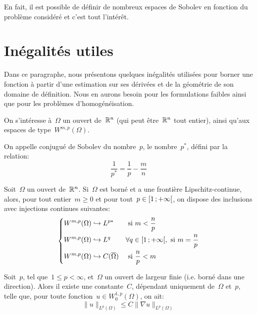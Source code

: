 \medskip
En fait, il est possible de définir de nombreux espaces de Sobolev en fonction du problème considéré et c'est tout l'intérêt.

\medskip
\section{Inégalités utiles}
Dans ce paragraphe, nous présentons quelques inégalités utilisées pour borner une fonction à partir d'une estimation sur ses dérivées et de la géométrie de son domaine de définition. Nous en aurons besoin pour les formulations faibles ainsi que pour les problèmes d'homogénéisation.
%
\begin{definition}
On s'intéresse à~$\Omega$ un ouvert de~$\mathbb R^n$ (qui peut être~$\mathbb R^n$ tout entier), ainsi qu'aux espaces de type~$W^{m,p}(\Omega)$.

On appelle conjugué de Sobolev du nombre~$p$, le nombre~$p^*$, défini par la relation:
\begin{equation}
  \frac{1}{p^*} = \frac{1}{p} - \frac{m}{n}
\end{equation}
\end{definition}
\begin{theoreme}\label{Th-Inj-Sobo}
Soit~$\Omega$ un ouvert de~$\mathbb R^n$. Si~$\Omega$ est borné et a une frontière Lipschitz-continue, alors, pour tout entier~$m\ge 0$ et pour tout~$p\in\mathopen{[}1\,;+\infty\mathclose{[}$, on dispose des inclusions avec injections continues suivantes:
\begin{equation}
\left\{\begin{aligned}
&W^{m,p}(\Omega) \hookrightarrow L^{p*} && \text{ si } m<\frac{n}p\\
&W^{m,p}(\Omega) \hookrightarrow L^q && \forall q\in\mathopen{[}1\,;+\infty\mathclose{[}, \text{ si } m=\frac{n}p\\
&W^{m,p}(\Omega) \hookrightarrow C(\overline{\Omega}) && \text{ si } \frac{n}p<m
\end{aligned}\right.
\end{equation}
\end{theoreme}

\medskipvm
\begin{theoreme}
Soit~$p$, tel que~$1 \le p <\infty$, et~$\Omega$ un ouvert de largeur finie
(i.e. borné dans une direction).
Alors il existe une constante~$C$, dépendant uniquement de~$\Omega$ et~$p$, telle que, pour toute fonction~$u\in W_0^{1,p}(\Omega)$, on ait:
\begin{equation}
\|u\|_{L^p(\Omega)} \le C \|\nabla u\|_{L^p(\Omega)}
\end{equation}
\end{theoreme}


